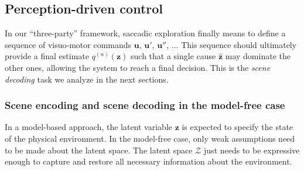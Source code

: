 \documentclass[12pt,twoside,openright]{article}
\begin{document}









 




\subsection{Perception-driven control}\label{sec:perception-driven-control}

In our ``three-party'' framework, 
saccadic exploration finally means to define a sequence of visuo-motor commands $\boldsymbol{u}$, $\boldsymbol{u}'$, $\boldsymbol{u}''$, ... This sequence should ultimately provide a final estimate $q^{(n)}(\boldsymbol{z})$ such that a single cause $\hat{\boldsymbol{z}}$ may dominate the other ones, allowing the system to reach a final decision. This is the \emph{scene decoding} task we analyze in the next sections.

\subsubsection{Scene encoding and scene decoding in the model-free case}

In a model-based approach, the latent variable $\boldsymbol{z}$ is expected to specify the state of the physical environment. In the model-free case, only weak assumptions need to be made about the latent space.  The latent space $\mathcal{Z}$ just needs to be expressive enough to capture and restore all necessary information about the environment.  
\end{document}
